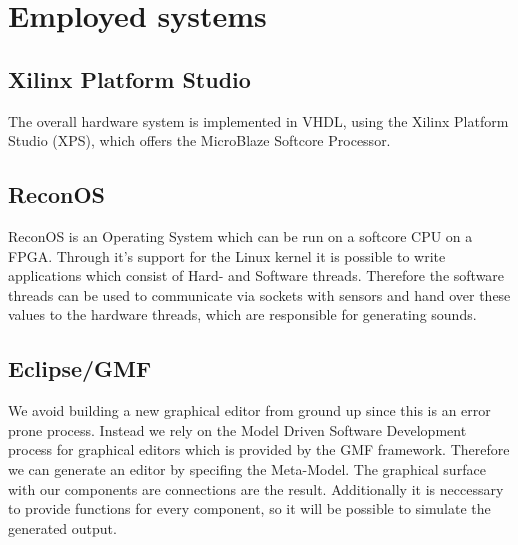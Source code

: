 	\section{Employed systems}
	  \subsection{Xilinx Platform Studio}
	    The overall hardware system is implemented in VHDL, using the Xilinx Platform Studio (XPS), which offers the MicroBlaze Softcore Processor.
	  \subsection{ReconOS}
		ReconOS is an Operating System which can be run on a softcore CPU on a FPGA. Through it's support for the Linux kernel it is possible to write applications which consist of Hard- and Software threads. Therefore the software threads can be used to communicate via sockets with sensors and hand over these values to the hardware threads, which are responsible for generating sounds.
	  \subsection{Eclipse/GMF}
		We avoid building a new graphical editor from ground up since this is an error prone process. Instead we rely on the Model Driven Software Development process for graphical editors which is provided by the GMF framework. Therefore we can generate an editor by specifing the Meta-Model. The graphical surface with our components are connections are the result. Additionally it is neccessary to provide functions for every component, so it will be possible to simulate the generated output.
      